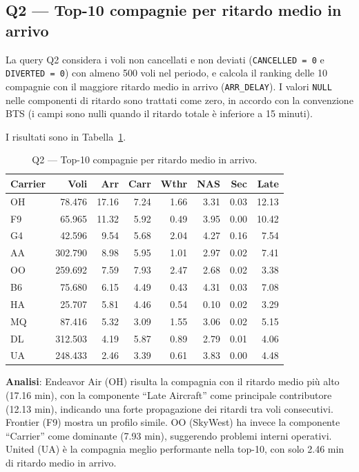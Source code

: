 \documentclass[sigconf]{acmart}
\begin{document}
\subsection{Q2 — Top-10 compagnie per ritardo medio in arrivo}

La query Q2 considera i voli non cancellati e non deviati
(\texttt{CANCELLED = 0} e \texttt{DIVERTED = 0}) con almeno 500 voli nel
periodo, e calcola il ranking delle 10 compagnie con il maggiore ritardo medio
in arrivo (\texttt{ARR\_DELAY}). I valori \texttt{NULL} nelle componenti di
ritardo sono trattati come zero, in accordo con la convenzione BTS (i campi
sono nulli quando il ritardo totale è inferiore a 15 minuti).

I risultati sono in Tabella~\ref{tab:q2}.

\begin{table}[h]
\caption{Q2 — Top-10 compagnie per ritardo medio in arrivo.}
\label{tab:q2}
\small
\begin{tabular}{lrrrrrrr}
\toprule
Carrier & Voli & Arr & Carr & Wthr & NAS & Sec & Late \\
\midrule
OH &  78.476 & 17.16 & 7.24 & 1.66 & 3.31 & 0.03 & 12.13 \\
F9 &  65.965 & 11.32 & 5.92 & 0.49 & 3.95 & 0.00 & 10.42 \\
G4 &  42.596 &  9.54 & 5.68 & 2.04 & 4.27 & 0.16 &  7.54 \\
AA & 302.790 &  8.98 & 5.95 & 1.01 & 2.97 & 0.02 &  7.41 \\
OO & 259.692 &  7.59 & 7.93 & 2.47 & 2.68 & 0.02 &  3.38 \\
B6 &  75.680 &  6.15 & 4.49 & 0.43 & 4.31 & 0.03 &  7.08 \\
HA &  25.707 &  5.81 & 4.46 & 0.54 & 0.10 & 0.02 &  3.29 \\
MQ &  87.416 &  5.32 & 3.09 & 1.55 & 3.06 & 0.02 &  5.15 \\
DL & 312.503 &  4.19 & 5.87 & 0.89 & 2.79 & 0.01 &  4.06 \\
UA & 248.433 &  2.46 & 3.39 & 0.61 & 3.83 & 0.00 &  4.48 \\
\bottomrule
\end{tabular}
\end{table}

\textbf{Analisi}: Endeavor Air (OH) risulta la compagnia con il ritardo medio
più alto (17.16 min), con la componente ``Late Aircraft'' come principale
contributore (12.13 min), indicando una forte propagazione dei ritardi tra
voli consecutivi. Frontier (F9) mostra un profilo simile. OO (SkyWest) ha
invece la componente ``Carrier'' come dominante (7.93 min), suggerendo
problemi interni operativi. United (UA) è la compagnia meglio performante
nella top-10, con solo 2.46 min di ritardo medio in arrivo.
\end{document}

